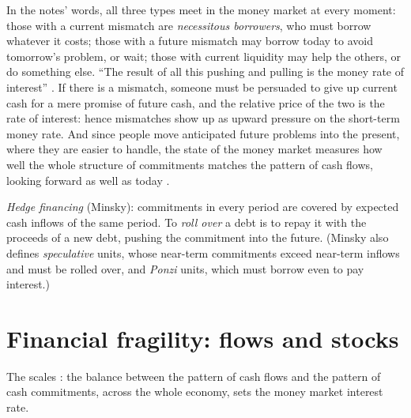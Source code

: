 \begin{paracol}{2}
In the notes' words, all three types meet in the money market at every moment: those with a current mismatch are \emph{necessitous
borrowers}, who must borrow whatever it costs; those with a future mismatch may borrow today to avoid tomorrow's problem, or wait; those with
current liquidity may help the others, or do something else. ``The result of all this pushing and pulling is the money rate of interest''
. If there is a mismatch, someone must be persuaded to give up current cash for a mere promise of future cash, and the relative price of the
two is the rate of interest: hence mismatches show up as upward pressure on the short-term money rate. And since people move anticipated future
problems into the present, where they are easier to handle, the state of the money market measures how well the whole structure of commitments
matches the pattern of cash flows, looking forward as well as today .

\begin{definition}
\emph{Hedge financing} (Minsky): commitments in every period are covered by expected cash inflows of the same period. To \emph{roll over}
a debt is to repay it with the proceeds of a new debt, pushing the commitment into the future. (Minsky also defines \emph{speculative}
units, whose near-term commitments exceed near-term inflows and must be rolled over, and \emph{Ponzi} units, which must borrow even to pay
interest.)
\end{definition}

\section{Financial fragility: flows and stocks}\label{sec:mv-fragility}

\begin{nfigure}
\caption{The scales : the balance between the pattern of cash flows and the pattern of cash commitments, across the
whole economy, sets the money market interest rate.}\label{fig:mv-scales}
\end{nfigure}


\end{paracol}
